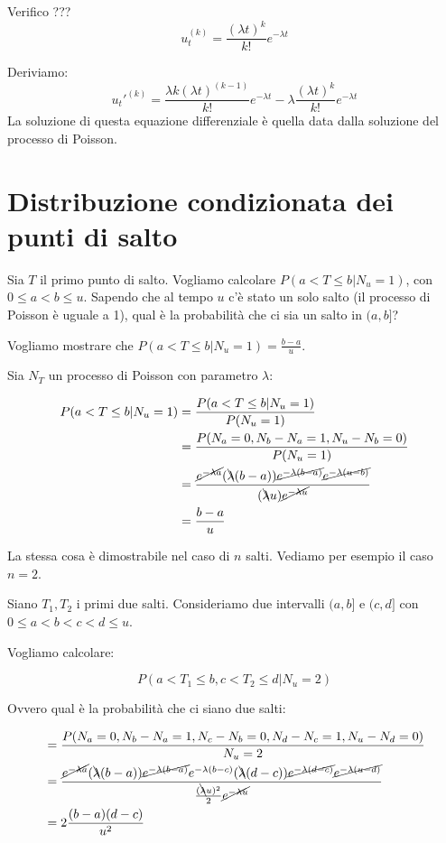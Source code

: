 \documentclass[a4paper,12pt]{book}
\begin{document}
Verifico ??? %
$$ u_t^{(k)} = \frac{(\lambda t)^k}{k!} e^{-\lambda t} $$

Deriviamo:
$$ u_t'^{(k)}= \frac{\lambda k (\lambda t)^{(k-1)}}{k!} e^{-\lambda t} -\lambda\frac{(\lambda t)^k}{k!} e^{-\lambda t} $$
La soluzione di questa equazione differenziale è quella data dalla soluzione del processo di Poisson. 


\section{Distribuzione condizionata dei punti di salto}
Sia $ T $ il primo punto di salto. Vogliamo calcolare $ P( a < T \le b | N_u = 1) $, con $ 0 \le a < b \le u $. Sapendo che al tempo $ u $ c'è stato un solo salto (il processo di Poisson è uguale a 1), qual è la probabilità che ci sia un salto in $ (a,b] $?

Vogliamo mostrare che $ P( a < T \le b | N_u = 1) = \frac{b-a}{u} $.

Sia $ N_T $ un processo di Poisson con parametro $\lambda$:

\begin{align*}
	P( a < T \le b | N_u = 1) & = \frac{P( a < T \le b | N_u = 1)}{P(N_u = 1)} \\
	& = \frac{P(N_a = 0, N_b - N_a = 1, N_u - N_b = 0)}{P(N_u = 1)} \\
	& = \frac{ \cancel{e^{-\lambda a}} (\bcancel{\lambda} (b-a)) \cancel{e^{-\lambda(b-a)}} \cancel{e^{-\lambda(u-b)}}  }{(\bcancel{\lambda} u) \cancel{e^{-\lambda u}}} \\
	& = \frac{b-a}{u}
\end{align*}

La stessa cosa è dimostrabile nel caso di $ n $ salti. Vediamo per esempio il caso $ n = 2 $. 

Siano $ T_1, T_2 $ i primi due salti. Consideriamo due intervalli $ (a,b] $ e $ (c,d] $ con $ 0 \le a < b < c < d \le u $.

Vogliamo calcolare:

$$ P(a < T_1 \le b, c < T_2 \le d | N_u = 2) $$

Ovvero qual è la probabilità che ci siano due salti:

\begin{align*}
	& = \frac{P(N_a = 0, N_b - N_a = 1, N_c - N_b = 0, N_d - N_c  = 1, N_u - N_d  = 0)}{N_u = 2} \\
	& = \frac{  \cancel{e^{-\lambda a}} (\bcancel{\lambda}(b-a)) \cancel{e^{-\lambda(b-a)}} e^{-\lambda(b-c )}    (\bcancel{\lambda}(d-c)) \cancel{e^{-\lambda(d-c)}} \cancel {e^{-\lambda(u-d)}}  } {\frac{(\bcancel{\lambda }u)^2}{2} \cancel{e^{-\lambda u}}} \\ %
	& = 2 \frac{(b-a)(d-c)}{u^2}
\end{align*}
\end{document}
